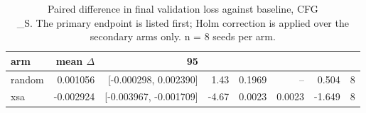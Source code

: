 \begin{table}[t]
  \centering
  \caption{Paired difference in final validation loss against baseline, CFG\\_S. The primary endpoint is listed first; Holm correction is applied over the secondary arms only. n = 8 seeds per arm.}
  \label{tab:t4}
  \begin{tabular}{lrrrrrrr}
    \toprule
    arm & mean $\Delta$ & 95\\%
    \midrule
    random & 0.001056 & [-0.000298, 0.002390] & 1.43 & 0.1969 & -- & 0.504 & 8 \\
    xsa & -0.002924 & [-0.003967, -0.001709] & -4.67 & 0.0023 & 0.0023 & -1.649 & 8 \\
    \bottomrule
  \end{tabular}
\end{table}
